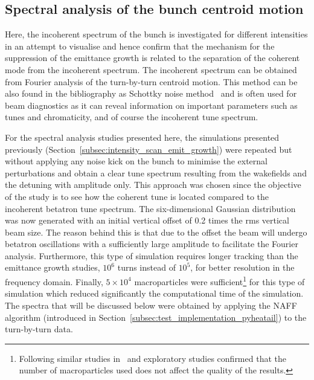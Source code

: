 \subsection{Spectral analysis of the bunch centroid motion}\label{subsec:spectral_analysis_schottky}
Here, the incoherent spectrum of the bunch is investigated for different intensities in an attempt to visualise and hence confirm that the mechanism for the suppression of the emittance growth is related to the separation of the coherent mode from the incoherent spectrum. The incoherent spectrum can be obtained from Fourier analysis of the turn-by-turn centroid motion. This method can be also found in the bibliography as Schottky noise method~\cite{Caspers:1213284} and is often used for beam diagnostics as it can reveal information on important parameters such as tunes and chromaticity, and of course the incoherent tune spectrum.


For the spectral analysis studies presented here, the simulations presented previously (Section~\ref{subsec:intensity_scan_emit_growth}) were repeated but without applying any noise kick on the bunch to minimise the external perturbations and obtain a clear tune spectrum resulting from the wakefields and the detuning with amplitude only. This approach was chosen since the objective of the study is to see how the coherent tune is located compared to the incoherent betatron tune spectrum. The six-dimensional Gaussian distribution was now generated with an initial vertical offset of 0.2 times the rms vertical beam size. The reason behind this is that due to the offset the beam will undergo betatron oscillations with a sufficiently large amplitude to facilitate the Fourier analysis. Furthermore, this type of simulation requires longer tracking than the emittance growth studies, $10^6$ turns instead of $10^5$, for better resolution in the frequency domain. Finally, $5 \times 10^4$ macroparticles were sufficient\footnote{Following similar studies in~\cite{Zorzano-Mier:446334} and exploratory studies confirmed that the number of macroparticles used does not affect the quality of the results.} for this type of simulation which reduced significantly the computational time of the simulation. The spectra that will be discussed below were obtained by applying the NAFF algorithm (introduced in Section~\ref{subsec:test_implementation_pyheatail}) to the turn-by-turn data.%

